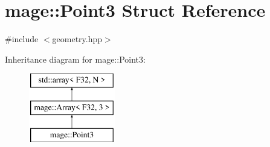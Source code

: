 \hypertarget{structmage_1_1_point3}{}\section{mage\+:\+:Point3 Struct Reference}
\label{structmage_1_1_point3}


{\ttfamily \#include $<$geometry.\+hpp$>$}

Inheritance diagram for mage\+:\+:Point3\+:\begin{figure}[H]
\begin{center}
\leavevmode
\includegraphics[height=3.000000cm]{structmage_1_1_point3}
\end{center}
\end{figure}
